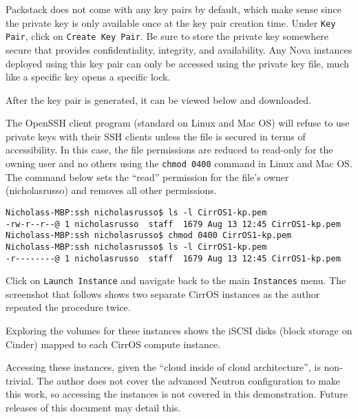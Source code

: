 
Packstack does not come with any key pairs by default, which make sense since
the private key is only available once at the key pair creation time. Under
\verb|Key Pair|, click on \verb|Create Key Pair|. Be sure to store the private
key somewhere secure that provides confidentiality, integrity, and
availability. Any Nova instances deployed using this key pair can only be
accessed using the private key file, much like a specific key opens a specific
lock.


After the key pair is generated, it can be viewed below and downloaded.


The OpenSSH client program (standard on Linux and Mac OS) will refuse to use
private keys with their SSH clients unless the file is secured in terms of
accessibility. In this case, the file permissions are reduced to read-only for
the owning user and no others using the \verb|chmod 0400| command in Linux and
Mac OS\@. The command below sets the ``read'' permission for the file's owner
(nicholasrusso) and removes all other permissions.

\begin{verbatim}
Nicholass-MBP:ssh nicholasrusso$ ls -l CirrOS1-kp.pem
-rw-r--r--@ 1 nicholasrusso  staff  1679 Aug 13 12:45 CirrOS1-kp.pem
Nicholass-MBP:ssh nicholasrusso$ chmod 0400 CirrOS1-kp.pem
Nicholass-MBP:ssh nicholasrusso$ ls -l CirrOS1-kp.pem
-r--------@ 1 nicholasrusso  staff  1679 Aug 13 12:45 CirrOS1-kp.pem
\end{verbatim}

Click on \verb|Launch Instance| and navigate back to the main \verb|Instances|
menu. The screenshot that follows shows two separate CirrOS instances
as the author repeated the procedure twice.


Exploring the volumes for these instances shows the iSCSI disks (block storage
on Cinder) mapped to each CirrOS compute instance.


Accessing these instances, given the ``cloud inside of cloud architecture'',
is non-trivial. The author does not cover the advanced Neutron configuration
to make this work, so accessing the instances is not covered in this
demonstration. Future releases of this document may detail this.

